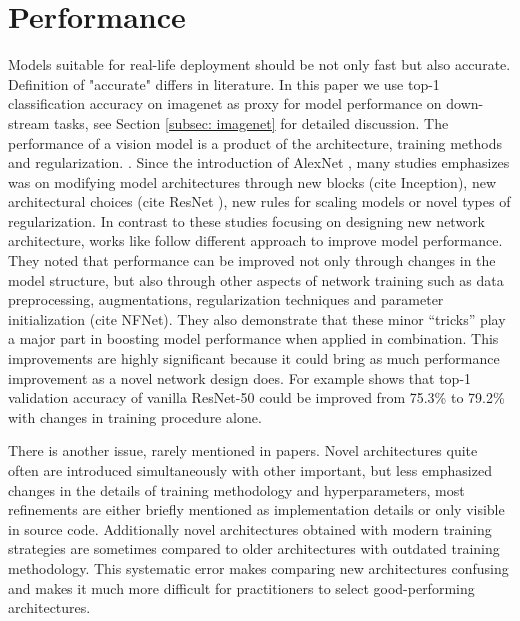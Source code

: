 \chapter{Performance} \label{chap:performance}

Models suitable for real-life deployment should be not only fast but also accurate. Definition of "accurate" differs in literature. In this paper we use top-1 classification accuracy on imagenet as proxy for model performance on down-stream tasks, see Section \ref{subsec: imagenet} for detailed discussion. 
The performance of a vision model is a product of the architecture, training methods and regularization. \cite{lee2020_compounding_improvements}. 
Since the introduction of AlexNet \cite{krizhevsky2012_imagenet_alexnet}, many studies emphasizes was on modifying model architectures through new blocks (cite Inception), new architectural choices (cite ResNet ), new rules for scaling models \cite{tan2019_efficientnet} or novel types of regularization. \cite{zhang2017_mixup} \cite{yun2019_cutmix}
In contrast to these studies focusing on designing new network architecture, works like \cite{he2019_bag_of_tricks} follow different approach to improve model performance. They noted that performance can be improved not only through changes in the model structure, but also through other aspects of network training such as data preprocessing, augmentations, regularization techniques and parameter initialization (cite NFNet). They also demonstrate that these minor “tricks” play a major part in boosting model performance when applied in combination. This improvements are highly significant because it could bring as much performance improvement as a novel network design does. For example \cite{he2019_bag_of_tricks} shows that top-1 validation accuracy of vanilla ResNet-50 could be improved from 75.3\% to 79.2\% with changes in training procedure alone. 


There is another issue, rarely mentioned in papers. Novel architectures quite often are introduced simultaneously with other important, but less emphasized changes in the details of training methodology and hyperparameters, most refinements are either briefly mentioned as implementation details or only visible in source code. Additionally novel architectures obtained with modern training strategies are sometimes compared to older architectures with outdated training methodology. This systematic error makes comparing new architectures confusing and makes it much more difficult for practitioners to select good-performing architectures. 

